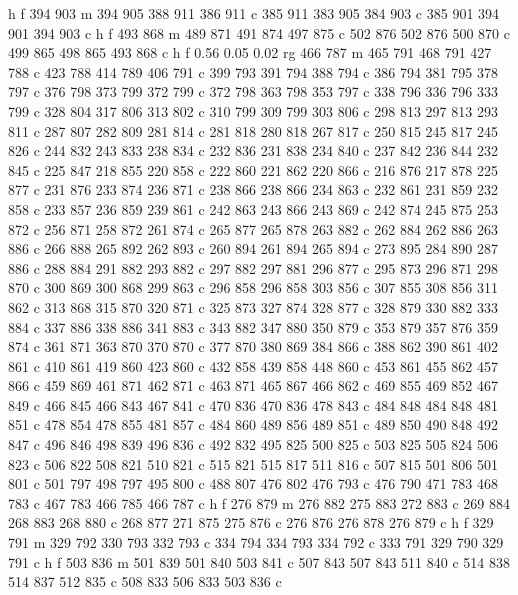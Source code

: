 {{   h f
   394 903 m
   394 905 388 911 386 911 c
   385 911 383 905 384 903 c
   385 901 394 901 394 903 c
   h f
   493 868 m
   489 871 491 874 497 875 c
   502 876 502 876 500 870 c
   499 865 498 865 493 868 c
   h f
   0.56 0.05 0.02 rg
   466 787 m
   465 791 468 791 427 788 c
   423 788 414 789 406 791 c
   399 793 391 794 388 794 c
   386 794 381 795 378 797 c
   376 798 373 799 372 799 c
   372 798 363 798 353 797 c
   338 796 336 796 333 799 c
   328 804 317 806 313 802 c
   310 799 309 799 303 806 c
   298 813 297 813 293 811 c
   287 807 282 809 281 814 c
   281 818 280 818 267 817 c
   250 815 245 817 245 826 c
   244 832 243 833 238 834 c
   232 836 231 838 234 840 c
   237 842 236 844 232 845 c
   225 847 218 855 220 858 c
   222 860 221 862 220 866 c
   216 876 217 878 225 877 c
   231 876 233 874 236 871 c
   238 866 238 866 234 863 c
   232 861 231 859 232 858 c
   233 857 236 859 239 861 c
   242 863 243 866 243 869 c
   242 874 245 875 253 872 c
   256 871 258 872 261 874 c
   265 877 265 878 263 882 c
   262 884 262 886 263 886 c
   266 888 265 892 262 893 c
   260 894 261 894 265 894 c
   273 895 284 890 287 886 c
   288 884 291 882 293 882 c
   297 882 297 881 296 877 c
   295 873 296 871 298 870 c
   300 869 300 868 299 863 c
   296 858 296 858 303 856 c
   307 855 308 856 311 862 c
   313 868 315 870 320 871 c
   325 873 327 874 328 877 c
   328 879 330 882 333 884 c
   337 886 338 886 341 883 c
   343 882 347 880 350 879 c
   353 879 357 876 359 874 c
   361 871 363 870 370 870 c
   377 870 380 869 384 866 c
   388 862 390 861 402 861 c
   410 861 419 860 423 860 c
   432 858 439 858 448 860 c
   453 861 455 862 457 866 c
   459 869 461 871 462 871 c
   463 871 465 867 466 862 c
   469 855 469 852 467 849 c
   466 845 466 843 467 841 c
   470 836 470 836 478 843 c
   484 848 484 848 481 851 c
   478 854 478 855 481 857 c
   484 860 489 856 489 851 c
   489 850 490 848 492 847 c
   496 846 498 839 496 836 c
   492 832 495 825 500 825 c
   503 825 505 824 506 823 c
   506 822 508 821 510 821 c
   515 821 515 817 511 816 c
   507 815 501 806 501 801 c
   501 797 498 797 495 800 c
   488 807 476 802 476 793 c
   476 790 471 783 468 783 c
   467 783 466 785 466 787 c
   h f
   276 879 m
   276 882 275 883 272 883 c
   269 884 268 883 268 880 c
   268 877 271 875 275 876 c
   276 876 276 878 276 879 c
   h f
   329 791 m
   329 792 330 793 332 793 c
   334 794 334 793 334 792 c
   333 791 329 790 329 791 c
   h f
   503 836 m
   501 839 501 840 503 841 c
   507 843 507 843 511 840 c
   514 838 514 837 512 835 c
   508 833 506 833 503 836 c
}}
